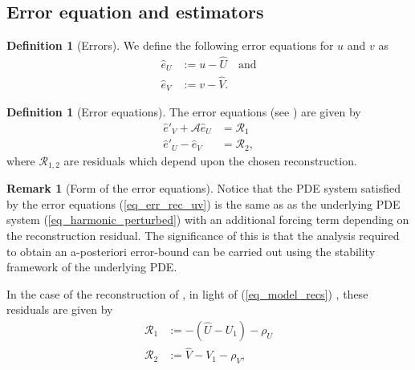\documentclass[12pt,a4paper]{article}
\numberwithin{equation}{section}
\theoremstyle{definition}
\newcommand{\qp}[1]{\left(#1\right)}
\newtheorem{Defn}[subsection]{Definition}
\newtheorem{Rem}[subsection]{Remark}
\begin{document}
\subsection{Error equation and estimators}\label{subsec_error_estimators}
\begin{Defn}[Errors]\label{defn:errors}
We define the following error equations for $u$ and $v$ as
\begin{equation}\label{eq_err_rec_uv}
\begin{aligned}
\hat{e}_U&:=u-\hat{U} \quad \text{and}\\
\hat{e}_V&:=v-\hat{V}.
\end{aligned}
\end{equation}
\end{Defn}

\begin{Defn}[Error equations]
The error equations (see \cite[eq. 3.2]{georgoulis2016posteriori}) are given by 
\begin{equation}\label{eq_error_eqs}
\begin{aligned}
\hat{e}'_V+\mathcal{A}\hat{e}_U&=\mathcal{R}_1\\
\hat{e}'_U-\hat{e}_V&=\mathcal{R}_2,
\end{aligned}
\end{equation}
where  $\mathcal{R}_{1,2}$ are residuals which depend upon the chosen reconstruction.
\end{Defn}
\begin{Rem}[Form of the error equations]
Notice that the PDE system satisfied by the error equations (\ref{eq_err_rec_uv}) is the same as as the underlying PDE system (\ref{eq_harmonic_perturbed}) with an additional forcing term depending on the reconstruction residual.  The significance of this is that the analysis required to obtain an a-posteriori error-bound can be carried out using the stability framework of the underlying PDE.
\end{Rem}
 In the case of the reconstruction of \cite{georgoulis2016posteriori}, in light of (\ref{eq_model_recs}) , these residuals are given by
\begin{equation}\label{eq_residuals_paper}
\begin{aligned}
\mathcal{R}_1&:=-\left(\hat{U}-U_1\right)-\rho_U\\
\mathcal{R}_2&:=\hat{V}-V_1-\rho_V,
\end{aligned}
\end{equation}
\end{document}
